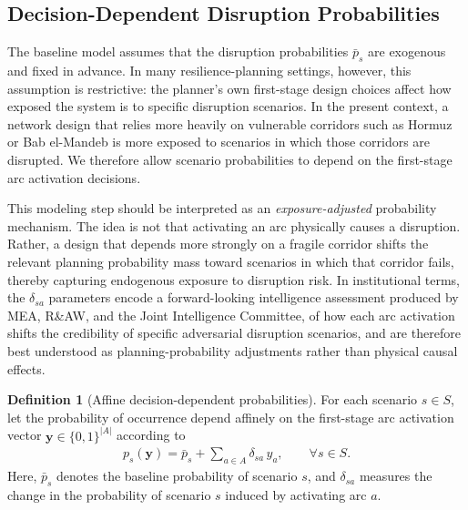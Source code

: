 \documentclass[final,3p,authoryear]{elsarticle}
\theoremstyle{definition}
\newtheorem{definition}{Definition}
\begin{document}
\subsection{Decision-Dependent Disruption Probabilities}
\label{sec:ddu}

The baseline model assumes that the disruption probabilities
$\bar p_s$ are exogenous and fixed in advance. In many resilience-planning
settings, however, this assumption is restrictive: the planner's own
first-stage design choices affect how exposed the system is to specific
disruption scenarios. In the present context, a network design that relies
more heavily on vulnerable corridors such as Hormuz or Bab el-Mandeb is
more exposed to scenarios in which those corridors are disrupted. We
therefore allow scenario probabilities to depend on the first-stage arc
activation decisions.

This modeling step should be interpreted as an \emph{exposure-adjusted}
probability mechanism. The idea is not that activating an arc physically
causes a disruption. Rather, a design that depends more strongly on a
fragile corridor shifts the relevant planning probability mass toward
scenarios in which that corridor fails, thereby capturing endogenous
exposure to disruption risk. 
In institutional terms, the $\delta_{sa}$ parameters encode a
forward-looking intelligence assessment produced by MEA, R\&AW,
and the Joint Intelligence Committee, of how each arc activation
shifts the credibility of specific adversarial disruption scenarios,
and are therefore best understood as planning-probability
adjustments rather than physical causal effects.

\begin{definition}[Affine decision-dependent probabilities]
\label{def:ddp}
For each scenario $s \in S$, let the probability of occurrence depend
affinely on the first-stage arc activation vector
$\mathbf y \in \{0,1\}^{|A|}$ according to
\begin{align}
p_s(\mathbf y)
=
\bar p_s + \sum_{a \in A} \delta_{sa}\, y_a,
\qquad \forall s \in S.
\label{eq:ddp}
\end{align}
Here, $\bar p_s$ denotes the baseline probability of scenario $s$, and
$\delta_{sa}$ measures the change in the probability of scenario $s$
induced by activating arc $a$.
\end{definition}



\end{document}
